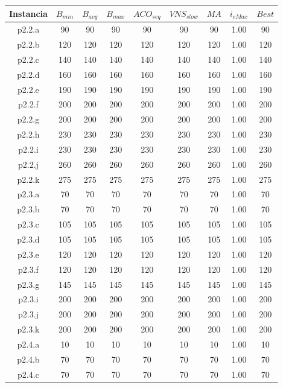 \begin{table}
\begin{center}
\begin{tabular}{ |c|c|c|c|c|c|c|c|c| } 
\hline
Instancia & $B_{min}$ & $B_{avg}$ & $B_{max}$ & $ACO_{seq}$ & $VNS_{slow}$ & $MA$ & $i_{eMax}$ & $Best$ \\
\hline
p2.2.a & 90 & 90 & 90 & 90 & 90 & 90 & 1.00 & 90 \\
p2.2.b & 120 & 120 & 120 & 120 & 120 & 120 & 1.00 & 120 \\
p2.2.c & 140 & 140 & 140 & 140 & 140 & 140 & 1.00 & 140 \\
p2.2.d & 160 & 160 & 160 & 160 & 160 & 160 & 1.00 & 160 \\
p2.2.e & 190 & 190 & 190 & 190 & 190 & 190 & 1.00 & 190 \\
p2.2.f & 200 & 200 & 200 & 200 & 200 & 200 & 1.00 & 200 \\
p2.2.g & 200 & 200 & 200 & 200 & 200 & 200 & 1.00 & 200 \\
p2.2.h & 230 & 230 & 230 & 230 & 230 & 230 & 1.00 & 230 \\
p2.2.i & 230 & 230 & 230 & 230 & 230 & 230 & 1.00 & 230 \\
p2.2.j & 260 & 260 & 260 & 260 & 260 & 260 & 1.00 & 260 \\
p2.2.k & 275 & 275 & 275 & 275 & 275 & 275 & 1.00 & 275 \\
p2.3.a & 70 & 70 & 70 & 70 & 70 & 70 & 1.00 & 70 \\
p2.3.b & 70 & 70 & 70 & 70 & 70 & 70 & 1.00 & 70 \\
p2.3.c & 105 & 105 & 105 & 105 & 105 & 105 & 1.00 & 105 \\
p2.3.d & 105 & 105 & 105 & 105 & 105 & 105 & 1.00 & 105 \\
p2.3.e & 120 & 120 & 120 & 120 & 120 & 120 & 1.00 & 120 \\
p2.3.f & 120 & 120 & 120 & 120 & 120 & 120 & 1.00 & 120 \\
p2.3.g & 145 & 145 & 145 & 145 & 145 & 145 & 1.00 & 145 \\
p2.3.i & 200 & 200 & 200 & 200 & 200 & 200 & 1.00 & 200 \\
p2.3.j & 200 & 200 & 200 & 200 & 200 & 200 & 1.00 & 200 \\
p2.3.k & 200 & 200 & 200 & 200 & 200 & 200 & 1.00 & 200 \\
p2.4.a & 10 & 10 & 10 & 10 & 10 & 10 & 1.00 & 10 \\
p2.4.b & 70 & 70 & 70 & 70 & 70 & 70 & 1.00 & 70 \\
p2.4.c & 70 & 70 & 70 & 70 & 70 & 70 & 1.00 & 70 \\

\end{tabular}
\end{center}
\end{table}
